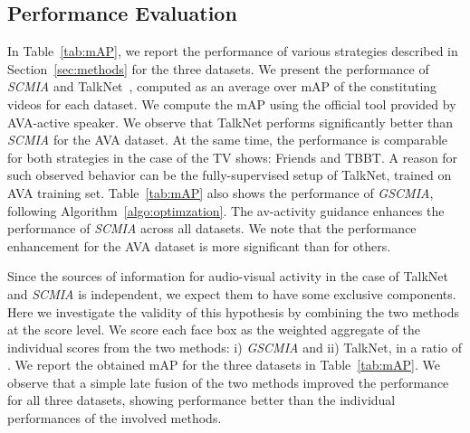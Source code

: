 \subsection{Performance Evaluation}
In Table~\ref{tab:mAP}, we report the performance of various strategies described in Section~\ref{sec:methods} for the three datasets. We present the performance of \emph{SCMIA} and TalkNet~\cite{tao2021someone}, computed as an average over mAP of the constituting videos for each dataset. We compute the mAP using the official tool provided by AVA-active speaker. We observe that TalkNet performs significantly better than \emph{SCMIA} for the AVA dataset. At the same time, the performance is comparable for both strategies in the case of the TV shows: Friends and TBBT. A reason for such observed behavior can be the fully-supervised setup of TalkNet, trained on AVA training set. Table~\ref{tab:mAP} also shows the performance of \emph{GSCMIA}, following Algorithm~\ref{algo:optimzation}. The av-activity guidance enhances the performance of \emph{SCMIA} across all datasets. We note that the performance enhancement for the AVA dataset is more significant than for others.

Since the sources of information for audio-visual activity in the case of TalkNet and \emph{SCMIA} is independent, we expect them to have some exclusive components. Here we investigate the validity of this hypothesis by combining the two methods at the score level. We score each face box as the weighted aggregate of the individual scores from the two methods: i) \emph{GSCMIA} and ii) TalkNet, in a ratio of .
We report the obtained mAP for the three datasets in Table~\ref{tab:mAP}. We observe that a simple late fusion of the two methods improved the performance for all three datasets, showing performance better than the individual performances of the involved methods.
\begin{table}[]
\centering
\caption{Performance of various strategies for ASD when guided with Talknet~\cite{talknet}. The reporting metric is mean average precision (\%).}
\label{tab:mAP}
\end{table}

